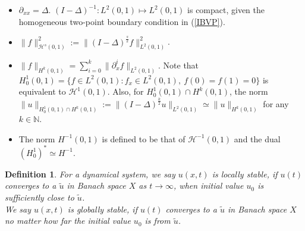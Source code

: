 \documentclass[10pt,a4paper,final]{article}
\numberwithin{equation}{section}
\newtheorem{definition}[theorem]{Definition}
\newcommand{\N}{\mathbb{N}}
\newcommand{\cH}{\mathcal{H}}
\begin{document}
\begin{itemize}
    \item $\partial_{xx}=\Delta.\,\,(I-\Delta)^{-1}:L^2(0,1)\mapsto L^2(0,1)$ is compact, given the homogeneous two-point boundary condition in (\ref{IBVP}). 
    \item $\|f\|_{\cH^s(0,1)}^2:=\|(I-\Delta)^{\frac{s}{2}}f\|_{L^2(0,1)}^2$.
    \item $\|f\|_{H^k(0,1)}= \sum_{i=0}^k \|\partial^i_xf\|_{L^2(0,1)}$. Note that $H^1_0(0,1)=\{f\in L^2(0,1): f_x\in L^2(0,1), \ f(0)=f(1)=0\}$ is equivalent to  $\cH^1(0,1)$. Also, for $H^1_0(0,1)\cap H^k(0,1)$, the norm $\|u\|_{H^1_0(0,1)\cap H^k(0,1)}:=\|(I-\Delta)^{\frac k2}u\|_{L^2(0,1)}\simeq \|u\|_{H^k(0,1)}$ for any $k\in\N$.
    \item The norm $H^{-1}(0,1)$ is defined to be that of $\cH^{-1}(0,1)$ and the dual $(H^1_0)^*\simeq H^{-1}$.
\end{itemize}


\begin{definition}
    For a dynamical system, we say $u(x,t)$ is locally stable, if $u(t)$ converges to a $\tilde u$ in Banach space $X$ as $t\rightarrow \infty$, when initial value $u_0$ is sufficiently close to $\tilde u$.\\


    We say $u(x,t)$ is globally stable, if $u(t)$ converges to a $\tilde u$ in Banach space $X$ no matter how far the initial value $u_0$ is from $\tilde u$.
\end{definition}
\end{document}
